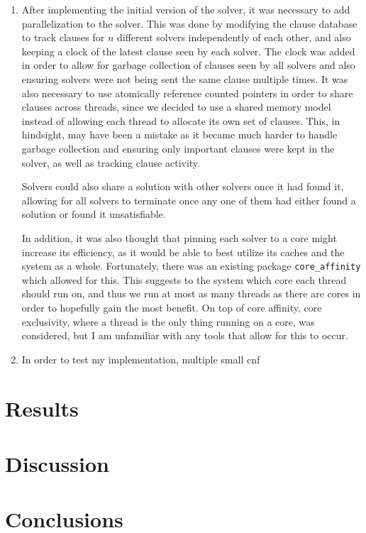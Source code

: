 \documentclass[11pt]{extarticle}
\begin{document}
\begin{enumerate}
\item
After implementing the initial version of the solver, it was necessary to add parallelization to
the solver. This was done by modifying the clause database to track clauses for $n$ different
solvers independently of each other, and also keeping a clock of the latest clause seen by each
solver. The clock was added in order to allow for garbage collection of clauses seen by all
solvers and also ensuring solvers were not being sent the same clause multiple times. It was
also necessary to use atomically reference counted pointers in order to share clauses across
threads, since we decided to use a shared memory model instead of allowing each thread to
allocate its own set of clauses. This, in hindsight, may have been a mistake as it became much
harder to handle garbage collection and ensuring only important clauses were kept in the solver,
as well as tracking clause activity.

Solvers could also share a solution with other solvers once it had found it, allowing for all
solvers to terminate once any one of them had either found a solution or found it unsatisfiable.

In addition, it was also thought that pinning each solver to a core might increase its
efficiency, as it would be able to best utilize its caches and the system as a whole.
Fortunately, there was an existing package \texttt{core_affinity} which allowed for this. This
suggests to the system which core each thread should run on, and thus we run at most as many
threads as there are cores in order to hopefully gain the most benefit. On top of core affinity,
core exclusivity, where a thread is the only thing running on a core, was considered, but I am
unfamiliar with any tools that allow for this to occur.
\item
In order to test my implementation, multiple small cnf

\end{enumerate}
\section*{Results}
\section*{Discussion}
\section*{Conclusions}



\nocite{*}

\end{document}
